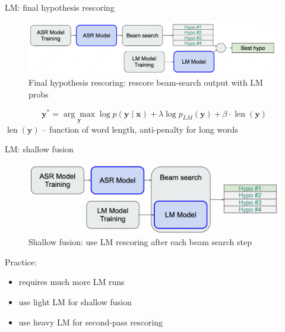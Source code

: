 \begin{frame}{LM: final hypothesis rescoring}
    \begin{figure}
    	\centering
    	\includegraphics[width=0.99\linewidth]{figs/lm_rescoring.png}
    	\caption{Final hypothesis rescoring: rescore beam-search output with LM probs}
    \end{figure}
    $$\boldsymbol{y}^*=\underset{\boldsymbol{y}}{\arg \max } \log p(\boldsymbol{y} \mid \boldsymbol{x})+\lambda \log p_{L M}(\boldsymbol{y}) +\beta \cdot \operatorname{len}(\boldsymbol{y})$$
    $\operatorname{len}(\boldsymbol{y})$ -- function of word length, anti-penalty for long words
\end{frame}
\begin{frame}{LM: shallow fusion}
    \begin{figure}
    	\centering
    	\includegraphics[width=0.99\linewidth]{figs/lm_shallow_fusion.png}
    	\caption{Shallow fusion: use LM rescoring after each beam search step}
    \end{figure}
    Practice: 
    \begin{itemize}
        \item requires much more LM runs
        \item use light LM for shallow fusion
        \item use heavy LM for second-pass rescoring
    \end{itemize}
\end{frame}
